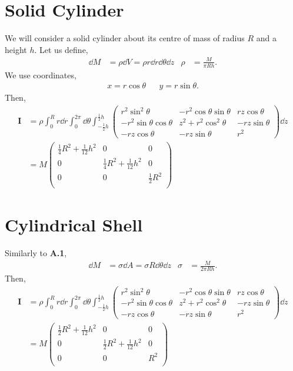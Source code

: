 \documentclass{book}
\begin{document}
\section{Solid Cylinder}
We will consider a solid cylinder about its centre of mass of radius $R$ and a height $h$. Let us define,
\begin{align}
    \dd{M} & = \rho\dd{V} = \rho r \dd{r}\dd{\theta}\dd{z} & \rho & = \frac{M}{\pi R h}.
\end{align}
We use coordinates,
\begin{align}
    x = r \cos\theta && y = r\sin\theta.
\end{align}
Then,
\begin{equation}
\begin{split}
    \mathbf{I} & = \rho\int_0^Rr\dd{r}\int_0^{2\pi}\dd{\theta} \int_{-\frac{1}{2}h}^{\frac{1}{2}h}\begin{pmatrix}
        r^2\sin^2\theta & -r^2\cos\theta\sin\theta & rz\cos\theta \\
        -r^2\sin\theta\cos\theta & z^2 + r^2\cos^2\theta & -rz\sin\theta \\
        -rz\cos\theta & -rz\sin\theta & r^2
    \end{pmatrix}\dd{z}
    \\
    & = M\begin{pmatrix}
        \frac{1}{4}R^2 + \frac{1}{12}h^2 & 0 & 0\\
        0 & \frac{1}{4}R^2 + \frac{1}{12}h^2 & 0 \\
        0 & 0 & \frac{1}{2}R^2 \\
    \end{pmatrix}
\end{split}
\end{equation}
\section{Cylindrical Shell}
Similarly to \textbf{A.1},
\begin{align}
    \dd{M} & = \sigma \dd{A} = \sigma R \dd{\theta}\dd{z} & \sigma & = \frac{M}{2\pi R h}. 
\end{align}
Then,
\begin{equation}
\begin{split}
    \mathbf{I} & = \rho\int_0^Rr\dd{r}\int_0^{2\pi}\dd{\theta} \int_{-\frac{1}{2}h}^{\frac{1}{2}h}\begin{pmatrix}
        r^2\sin^2\theta & -r^2\cos\theta\sin\theta & rz\cos\theta \\
        -r^2\sin\theta\cos\theta & z^2 + r^2\cos^2\theta & -rz\sin\theta \\
        -rz\cos\theta & -rz\sin\theta & r^2
    \end{pmatrix}\dd{z}
     \\
    & = M\begin{pmatrix}
        \frac{1}{2}R^2 + \frac{1}{12}h^2 & 0 & 0\\
        0 & \frac{1}{2}R^2 + \frac{1}{12}h^2 & 0 \\
        0 & 0 & R^2 \\
    \end{pmatrix}
\end{split}
\end{equation}
\end{document}
